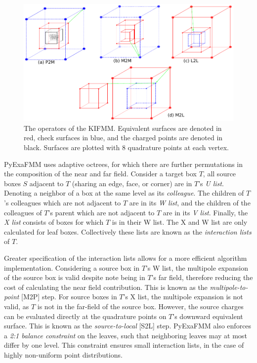 \documentclass{IEEEcsmag}
\begin{document}
\begin{figure}
	\centerline{\includegraphics {figures/operators.pdf}}
	\caption{The operators of the KIFMM. Equivalent surfaces are denoted in red, check surfaces in blue, and the charged points are denoted in black. Surfaces are plotted with 8 quadrature points at each vertex.}
	\label{fig:operators}
\end{figure}

PyExaFMM uses adaptive octrees, for which there are further permutations in the composition of the near and far field. Consider a target box $T$, all source boxes $S$ adjacent to $T$ (sharing an edge, face, or corner) are in $T$'s \textit{U list}. Denoting a neighbor of a box at the same level as its \textit{colleague}. The children of $T$'s colleagues which are not adjacent to $T$ are in its \textit{W list}, and the children of the colleagues of $T$'s parent which are not adjacent to $T$ are in its \textit{V list}. Finally, the \textit{X list} consists of boxes for which $T$ is in their W list. The X and W list are only calculated for leaf boxes. Collectively these lists are known as the \textit{interaction lists} of $T$.

Greater specification of the interaction lists allows for a more efficient algorithm implementation. Considering a source box in $T$'s W list, the multipole expansion of the source box is valid despite note being in $T$'s far field, therefore reducing the cost of calculating the near field contribution. This is known as the \textit{multipole-to-point} [M2P] step. For source boxes in $T$'s X list, the multipole expansion is not valid, as $T$ is not in the far-field of the source box. However, the source charges can be evaluated directly at the quadrature points on $T$'s downward equivalent surface. This is known as the \textit{source-to-local} [S2L] step.
PyExaFMM also enforces a \textit{2:1 balance constraint} on the leaves, such that neighboring leaves may at most differ by one level. This constraint ensures small interaction lists, in the case of highly non-uniform point distributions.
\end{document}
